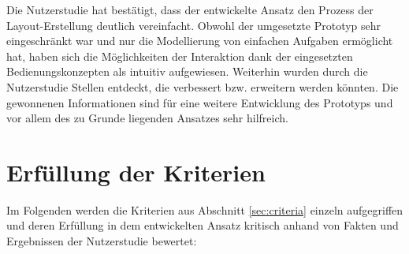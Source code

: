 Die Nutzerstudie hat bestätigt, dass der entwickelte Ansatz den Prozess der Layout-Erstellung deutlich vereinfacht. Obwohl der umgesetzte Prototyp sehr eingeschränkt war und nur die Modellierung von einfachen Aufgaben ermöglicht hat, haben sich die Möglichkeiten der Interaktion dank der eingesetzten Bedienungskonzepten als intuitiv aufgewiesen. Weiterhin wurden durch die Nutzerstudie Stellen entdeckt, die verbessert bzw. erweitern werden könnten. Die gewonnenen Informationen sind für eine weitere Entwicklung des Prototyps und vor allem des zu Grunde liegenden Ansatzes sehr hilfreich.

\section{Erfüllung der Kriterien}
\label{sec:criteria-evaluation}

Im Folgenden werden die Kriterien aus Abschnitt \ref{sec:criteria} einzeln aufgegriffen und deren Erfüllung in dem entwickelten Ansatz kritisch anhand von Fakten und Ergebnissen der Nutzerstudie bewertet:

